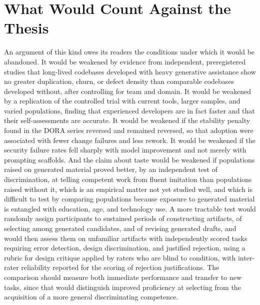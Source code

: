 \documentclass[11pt,a4paper]{article}
\theoremstyle{remark}
\begin{document}
\section{What Would Count Against the Thesis}

An argument of this kind owes its readers the conditions under which it would be abandoned. It would be weakened by evidence from independent, preregistered studies that long-lived codebases developed with heavy generative assistance show no greater duplication, churn, or defect density than comparable codebases developed without, after controlling for team and domain. It would be weakened by a replication of the controlled trial with current tools, larger samples, and varied populations, finding that experienced developers are in fact faster and that their self-assessments are accurate. It would be weakened if the stability penalty found in the DORA series reversed and remained reversed, so that adoption were associated with fewer change failures and less rework. It would be weakened if the security failure rates fell sharply with model improvement and not merely with prompting scaffolds. And the claim about taste would be weakened if populations raised on generated material proved better, by an independent test of discrimination, at telling competent work from fluent imitation than populations raised without it, which is an empirical matter not yet studied well, and which is difficult to test by comparing populations because exposure to generated material is entangled with education, age, and technology use. A more tractable test would randomly assign participants to sustained periods of constructing artifacts, of selecting among generated candidates, and of revising generated drafts, and would then assess them on unfamiliar artifacts with independently scored tasks requiring error detection, design discrimination, and justified rejection, using a rubric for design critique applied by raters who are blind to condition, with inter-rater reliability reported for the scoring of rejection justifications. The comparison should measure both immediate performance and transfer to new tasks, since that would distinguish improved proficiency at selecting from the acquisition of a more general discriminating competence.
\end{document}
